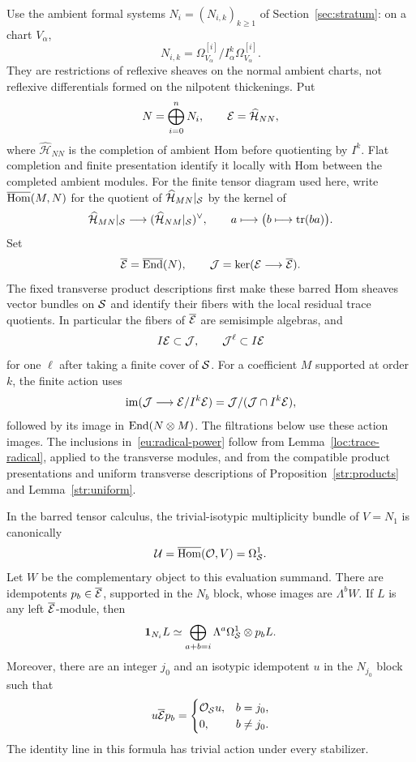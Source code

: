 Use the ambient formal systems $N_i=(N_{i,k})_{k\geq1}$ of
Section~\ref{sec:stratum}: on a chart $V_\alpha$,
\[
 N_{i,k}=\Omega_{V_\alpha}^{[i]}/I_\alpha^k\Omega_{V_\alpha}^{[i]}.
\]
They are restrictions of reflexive sheaves on the normal ambient charts,
not reflexive differentials formed on the nilpotent thickenings.  Put
\[
 N=\bigoplus_{i=0}^nN_i,\qquad
 \mathcal E=\widehat{\mathcal H}_{NN},
\]
where $\widehat{\mathcal H}_{NN}$ is the completion of ambient Hom
before quotienting by $I^k$.  Flat completion and finite presentation
identify it locally with Hom between the completed ambient modules.
For the finite tensor diagram used here, write
$\overline{\operatorname{Hom}}(M,N)$ for the quotient of
$\widehat{\mathcal H}_{MN}|_{\mathcal S}$ by the kernel of
\[
 \widehat{\mathcal H}_{MN}|_{\mathcal S}\longrightarrow
       (\widehat{\mathcal H}_{NM}|_{\mathcal S})^\vee,\qquad
 a\longmapsto\bigl(b\longmapsto\operatorname{tr}(ba)\bigr).
\]
Set
\[
 \overline{\mathcal E}=\overline{\operatorname{End}}(N),\qquad
 \mathcal J=\ker(\mathcal E\longrightarrow\overline{\mathcal E}).
\]
The fixed transverse product descriptions first make these barred Hom
sheaves vector bundles on $\mathcal S$ and identify their fibers with the local
residual trace quotients.  In particular the fibers of
$\overline{\mathcal E}$ are semisimple algebras, and
\begin{equation}\label{eu:radical-power}
 I\mathcal E\subset\mathcal J,\qquad \mathcal J^\ell\subset I\mathcal E
\end{equation}
for one $\ell$ after taking a finite cover of $\mathcal S$.
For a coefficient $M$ supported at order $k$, the finite action uses
\[
 \operatorname{im}(\mathcal J\longrightarrow\mathcal E/I^k\mathcal E)
      =\mathcal J/(\mathcal J\cap I^k\mathcal E),
\]
followed by its image in $\operatorname{End}(N\otimes M)$.  The filtrations below
use these action images.
The inclusions in~\eqref{eu:radical-power} follow from
Lemma~\ref{loc:trace-radical}, applied to the
transverse modules, and from
the compatible product presentations and uniform transverse descriptions
of Proposition~\ref{str:products} and Lemma~\ref{str:uniform}.

\begin{lemma}\label{eu:exterior}
In the barred tensor calculus, the trivial-isotypic multiplicity bundle
of $V=N_1$ is canonically
\[
 \mathcal U=\overline{\operatorname{Hom}}(\mathcal O,V)=\Omega^1_{\mathcal S}.
\]
Let $W$ be the complementary object to this evaluation summand.  There
are idempotents $p_b\in\overline{\mathcal E}$, supported in the $N_b$ block,
whose images are $\Lambda^bW$.  If $L$ is any left
$\overline{\mathcal E}$-module, then
\begin{equation}\label{eu:block-exterior}
 \mathbf1_{N_i}L\simeq
 \bigoplus_{a+b=i}\Lambda^a\Omega^1_{\mathcal S}\otimes p_bL.
\end{equation}
Moreover, there are an integer $j_0$ and an isotypic idempotent $u$ in
the $N_{j_0}$ block such that
\begin{equation}\label{eu:isolated-constituent}
 u\overline{\mathcal E}p_b=
 \begin{cases}
   \mathcal O_{\mathcal S}u,&b=j_0,\\
   0,&b\ne j_0.
 \end{cases}
\end{equation}
The identity line in this formula has trivial action under every
stabilizer.
\end{lemma}


